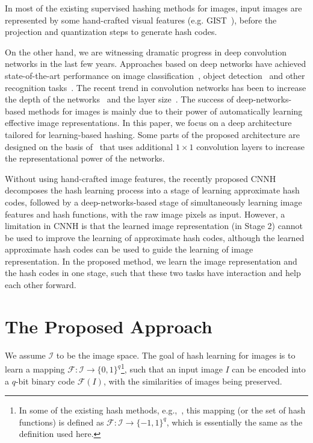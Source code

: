 \documentclass[10pt,twocolumn,letterpaper]{article}
\begin{document}
In most of the existing supervised hashing methods for images, input images are represented by some hand-crafted visual features (e.g. GIST~\cite{GIST}), before the projection and quantization steps to generate hash codes.

On the other hand, we are witnessing dramatic progress in deep convolution networks in the last few years. Approaches based on deep networks have achieved state-of-the-art performance on image classification~\cite{AlexNet,VGG,GoogleLeNet}, object detection~\cite{AlexNet,GoogleLeNet} and other recognition tasks~\cite{DeepFace}. The recent trend in convolution networks has been to increase the depth of the networks~\cite{NIN,VGG,GoogleLeNet} and the layer size~\cite{Overfeat,GoogleLeNet}. The success of deep-networks-based methods for images is mainly due to their power of automatically learning effective image representations. In this paper, we focus on a deep architecture tailored for learning-based hashing. Some parts of the proposed architecture are designed on the basis of~\cite{NIN} that uses additional $1\times 1$ convolution layers to increase the representational power of the networks.

 Without using hand-crafted image features, the recently proposed CNNH~\cite{CNNH} decomposes the hash learning process into a stage of learning approximate hash codes, followed by a deep-networks-based stage of simultaneously learning image features and hash functions, with the raw image pixels as input. However, a limitation in CNNH is that the learned image representation (in Stage 2) cannot be used to improve the learning of approximate hash codes, although the learned approximate hash codes can be used to guide the learning of image representation. In the proposed method, we learn the image representation and the hash codes in one stage, such that these two tasks have interaction and help each other forward.

\section{The Proposed Approach}
We assume $\mathcal{I}$ to be the image space. The goal of hash
learning for images is to learn a mapping
$\mathcal{F}:\mathcal{I}\rightarrow \{0,1\}^{q}$\footnote{In some of
the existing hash methods, e.g.,~\cite{CNNH,KSH}, this mapping (or
the set of hash functions) is defined as
$\mathcal{F}:\mathcal{I}\rightarrow \{-1,1\}^{q}$, which is
essentially the same as the definition used here.}, such that an
input image $I$ can be encoded into a $q$-bit binary code
$\mathcal{F}(I)$, with the similarities of images being preserved.
\end{document}
